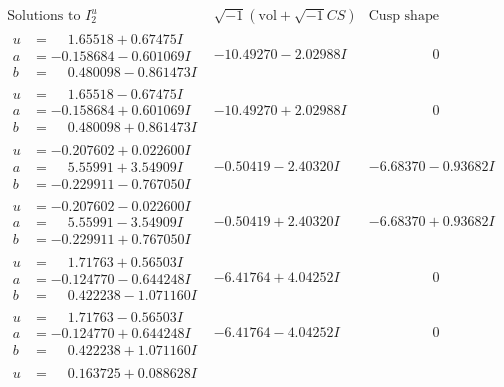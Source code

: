 \documentclass[1p]{elsarticle_modified}
\theoremstyle{definition}
\newcommand{\I}{\sqrt{-1}}
\begin{document}
$$\begin{array}{c|c|c}
\text{Solutions to }I^u_{2}& \I (\text{vol} + \sqrt{-1}CS) & \text{Cusp shape}\\
 \hline 
\begin{aligned}
u &= \phantom{-}1.65518 + 0.67475 I \\
a &= -0.158684 - 0.601069 I \\
b &= \phantom{-}0.480098 - 0.861473 I\end{aligned}
 & -10.49270 - 2.02988 I & \phantom{-0.000000 } 0 \\ \hline\begin{aligned}
u &= \phantom{-}1.65518 - 0.67475 I \\
a &= -0.158684 + 0.601069 I \\
b &= \phantom{-}0.480098 + 0.861473 I\end{aligned}
 & -10.49270 + 2.02988 I & \phantom{-0.000000 } 0 \\ \hline\begin{aligned}
u &= -0.207602 + 0.022600 I \\
a &= \phantom{-}5.55991 + 3.54909 I \\
b &= -0.229911 - 0.767050 I\end{aligned}
 & -0.50419 - 2.40320 I & -6.68370 - 0.93682 I \\ \hline\begin{aligned}
u &= -0.207602 - 0.022600 I \\
a &= \phantom{-}5.55991 - 3.54909 I \\
b &= -0.229911 + 0.767050 I\end{aligned}
 & -0.50419 + 2.40320 I & -6.68370 + 0.93682 I \\ \hline\begin{aligned}
u &= \phantom{-}1.71763 + 0.56503 I \\
a &= -0.124770 - 0.644248 I \\
b &= \phantom{-}0.422238 - 1.071160 I\end{aligned}
 & -6.41764 + 4.04252 I & \phantom{-0.000000 } 0 \\ \hline\begin{aligned}
u &= \phantom{-}1.71763 - 0.56503 I \\
a &= -0.124770 + 0.644248 I \\
b &= \phantom{-}0.422238 + 1.071160 I\end{aligned}
 & -6.41764 - 4.04252 I & \phantom{-0.000000 } 0 \\ \hline\begin{aligned}
u &= \phantom{-}0.163725 + 0.088628 I \\

\end{aligned}
\end{array}$$
\end{document}
